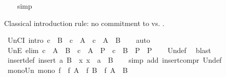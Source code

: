 \begin{isabellebody}
%
\isadelimproof
\ \ %
\endisadelimproof
%
\isatagproof
{}\isamarkupfalse%
\ simp%
\endisatagproof
{\isafoldproof}%
%
\isadelimproof
%
\endisadelimproof
%
\begin{isamarkuptext}%
\medskip Classical introduction rule: no commitment to  vs. .%
\end{isamarkuptext}\isamarkuptrue%
\isamarkupfalse%
\ UnCI\ {\isacharbrackleft}{\kern0pt}intro{\isacharbang}{\kern0pt}{\isacharbrackright}{\kern0pt}{\isacharcolon}{\kern0pt}\ {\isachardoublequoteopen}{\isacharparenleft}{\kern0pt}c\ {\isasymnotin}\ B\ {\isasymLongrightarrow}\ c\ {\isasymin}\ A{\isacharparenright}{\kern0pt}\ {\isasymLongrightarrow}\ c\ {\isasymin}\ A\ {\isasymunion}\ B{\isachardoublequoteclose}\isanewline
%
\isadelimproof
\ \ %
\endisadelimproof
%
\isatagproof
{}\isamarkupfalse%
\ auto%
\endisatagproof
{\isafoldproof}%
%
\isadelimproof
\isanewline
%
\endisadelimproof
\isanewline
{}\isamarkupfalse%
\ UnE\ {\isacharbrackleft}{\kern0pt}elim{\isacharbang}{\kern0pt}{\isacharbrackright}{\kern0pt}{\isacharcolon}{\kern0pt}\ {\isachardoublequoteopen}c\ {\isasymin}\ A\ {\isasymunion}\ B\ {\isasymLongrightarrow}\ {\isacharparenleft}{\kern0pt}c\ {\isasymin}\ A\ {\isasymLongrightarrow}\ P{\isacharparenright}{\kern0pt}\ {\isasymLongrightarrow}\ {\isacharparenleft}{\kern0pt}c\ {\isasymin}\ B\ {\isasymLongrightarrow}\ P{\isacharparenright}{\kern0pt}\ {\isasymLongrightarrow}\ P{\isachardoublequoteclose}\isanewline
%
\isadelimproof
\ \ %
\endisadelimproof
%
\isatagproof
{}\isamarkupfalse%
\ Un{\isacharunderscore}{\kern0pt}def\ \isamarkupfalse%
\ blast%
\endisatagproof
{\isafoldproof}%
%
\isadelimproof
\isanewline
%
\endisadelimproof
\isanewline
{}\isamarkupfalse%
\ insert{\isacharunderscore}{\kern0pt}def{\isacharcolon}{\kern0pt}\ {\isachardoublequoteopen}insert\ a\ B\ {\isacharequal}{\kern0pt}\ {\isacharbraceleft}{\kern0pt}x{\isachardot}{\kern0pt}\ x\ {\isacharequal}{\kern0pt}\ a{\isacharbraceright}{\kern0pt}\ {\isasymunion}\ B{\isachardoublequoteclose}\isanewline
%
\isadelimproof
\ \ %
\endisadelimproof
%
\isatagproof
{}\isamarkupfalse%
\ {\isacharparenleft}{\kern0pt}simp\ add{\isacharcolon}{\kern0pt}\ insert{\isacharunderscore}{\kern0pt}compr\ Un{\isacharunderscore}{\kern0pt}def{\isacharparenright}{\kern0pt}%
\endisatagproof
{\isafoldproof}%
%
\isadelimproof
\isanewline
%
\endisadelimproof
\isanewline
{}\isamarkupfalse%
\ mono{\isacharunderscore}{\kern0pt}Un{\isacharcolon}{\kern0pt}\ {\isachardoublequoteopen}mono\ f\ {\isasymLongrightarrow}\ f\ A\ {\isasymunion}\ f\ B\ {\isasymsubseteq}\ f\ {\isacharparenleft}{\kern0pt}A\ {\isasymunion}\ B{\isacharparenright}{\kern0pt}{\isachardoublequoteclose}\isanewline

\end{isabellebody}

